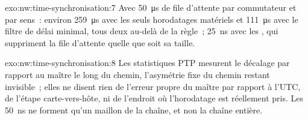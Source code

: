 \begin{solution}{exo:nw:time-synchronisation:7}
Avec \qty{50}{\micro\second} de file d'attente par commutateur et par sens~: environ \qty{259}{\micro\second} avec les seuls horodatages matériels et
\qty{111}{\micro\second} avec le filtre de délai minimal, tous deux au-delà de la règle~; \qty{25}{\nano\second} avec les , qui suppriment
la file d'attente quelle que soit sa taille.
\end{solution}

\begin{solution}{exo:nw:time-synchronisation:8}
Les statistiques PTP mesurent le décalage par rapport au maître le long du chemin, l'asymétrie fixe du chemin restant invisible~; elles ne disent rien de
l'erreur propre du maître par rapport à l'UTC, de l'étape carte-vers-hôte, ni de l'endroit où l'horodatage est réellement pris. Les 50~ns ne forment qu'un maillon de la chaîne, et non la
chaîne entière.
\end{solution}

